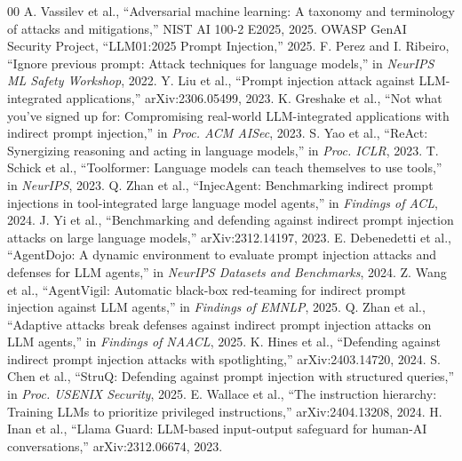 \documentclass[conference]{IEEEtran}
\begin{document}
\begin{thebibliography}{00}
 A. Vassilev et al., ``Adversarial machine learning: A taxonomy and terminology of attacks and mitigations,'' NIST AI 100-2 E2025, 2025.
 OWASP GenAI Security Project, ``LLM01:2025 Prompt Injection,'' 2025.
 F. Perez and I. Ribeiro, ``Ignore previous prompt: Attack techniques for language models,'' in \textit{NeurIPS ML Safety Workshop}, 2022.
 Y. Liu et al., ``Prompt injection attack against LLM-integrated applications,'' arXiv:2306.05499, 2023.
 K. Greshake et al., ``Not what you've signed up for: Compromising real-world LLM-integrated applications with indirect prompt injection,'' in \textit{Proc. ACM AISec}, 2023.
 S. Yao et al., ``ReAct: Synergizing reasoning and acting in language models,'' in \textit{Proc. ICLR}, 2023.
 T. Schick et al., ``Toolformer: Language models can teach themselves to use tools,'' in \textit{NeurIPS}, 2023.
 Q. Zhan et al., ``InjecAgent: Benchmarking indirect prompt injections in tool-integrated large language model agents,'' in \textit{Findings of ACL}, 2024.
 J. Yi et al., ``Benchmarking and defending against indirect prompt injection attacks on large language models,'' arXiv:2312.14197, 2023.
 E. Debenedetti et al., ``AgentDojo: A dynamic environment to evaluate prompt injection attacks and defenses for LLM agents,'' in \textit{NeurIPS Datasets and Benchmarks}, 2024.
 Z. Wang et al., ``AgentVigil: Automatic black-box red-teaming for indirect prompt injection against LLM agents,'' in \textit{Findings of EMNLP}, 2025.
 Q. Zhan et al., ``Adaptive attacks break defenses against indirect prompt injection attacks on LLM agents,'' in \textit{Findings of NAACL}, 2025.
 K. Hines et al., ``Defending against indirect prompt injection attacks with spotlighting,'' arXiv:2403.14720, 2024.
 S. Chen et al., ``StruQ: Defending against prompt injection with structured queries,'' in \textit{Proc. USENIX Security}, 2025.
 E. Wallace et al., ``The instruction hierarchy: Training LLMs to prioritize privileged instructions,'' arXiv:2404.13208, 2024.
 H. Inan et al., ``Llama Guard: LLM-based input-output safeguard for human-AI conversations,'' arXiv:2312.06674, 2023.

\end{thebibliography}
\end{document}
